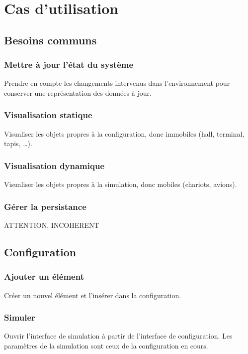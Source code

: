
\section{Cas d'utilisation}

\subsection{Besoins communs}
\subsubsection{Mettre à jour l'état du système}
Prendre en compte les changements intervenus dans l'environnement pour conserver une représentation des données à jour.
\subsubsection{Visualisation statique}
Visualiser les objets propres à la configuration, donc immobiles (hall, terminal, tapis, \ldots).
\subsubsection{Visualisation dynamique}
Visualiser les objets propres à la simulation, donc mobiles (chariots, avions).
\subsubsection{Gérer la persistance}
{\huge ATTENTION, INCOHERENT}

\subsection{Configuration}
\subsubsection{Ajouter un élément}
Créer un nouvel élément et l'insérer dans la configuration. 

\subsubsection{Simuler}
Ouvrir l'interface de simulation à partir de l'interface de configuration. Les paramètres de la simulation sont ceux de la configuration en cours.

